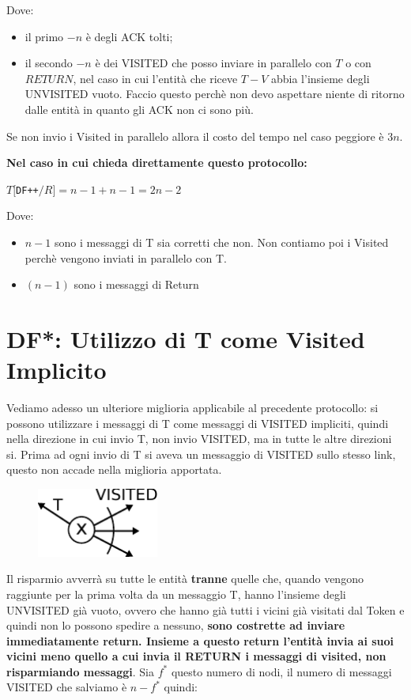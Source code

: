 Dove:
\begin{itemize}
    \item il primo $-n$ è degli ACK tolti;
    \item il secondo $-n$ è dei VISITED che posso inviare in parallelo con $T$ o
          con $RETURN$, nel caso in cui l'entità che riceve $T-V$ abbia l'insieme degli
          UNVISITED vuoto. Faccio questo perchè non devo aspettare niente di ritorno
          dalle entità in quanto gli ACK non ci sono più.
\end{itemize}
Se non invio i Visited in parallelo allora il costo del tempo nel caso peggiore
è $3n$.

\textbf{Nel caso in cui chieda direttamente questo protocollo:}
\begin{center}
    $T[$\texttt{DF++}$/R] = n-1 + n-1 = 2n - 2$
\end{center}
Dove:
\begin{itemize}
    \item $n-1$ sono i messaggi di T sia corretti che non. Non contiamo poi i
          Visited perchè vengono inviati in parallelo con T.
    \item $(n-1)$ sono i messaggi di Return
\end{itemize}

\section{DF*: Utilizzo di T come Visited Implicito}
Vediamo adesso un ulteriore miglioria applicabile al precedente protocollo: si
possono utilizzare i messaggi di T come messaggi di VISITED impliciti, quindi
nella direzione in cui invio T, non invio VISITED, ma in tutte le altre
direzioni si. Prima ad ogni invio di T si aveva un messaggio di VISITED sullo
stesso link, questo non accade nella miglioria apportata.

\begin{figure}[H]
    \centering
    \includegraphics[width=4cm, keepaspectratio]{images/n_19}
\end{figure}

Il risparmio avverrà su tutte le entità \textbf{tranne} quelle che, quando
vengono raggiunte per la prima volta da un messaggio T, hanno l'insieme degli
UNVISITED già vuoto, ovvero che hanno già tutti i vicini già visitati dal Token
e quindi non lo possono spedire a nessuno, \textbf{sono costrette ad inviare
    immediatamente return. Insieme a questo return l'entità invia ai suoi vicini
    meno quello a cui invia il RETURN i messaggi di visited, non risparmiando
    messaggi}. Sia $f^*$ questo numero di nodi, il numero di messaggi VISITED che
salviamo è $n-f^*$ quindi:

